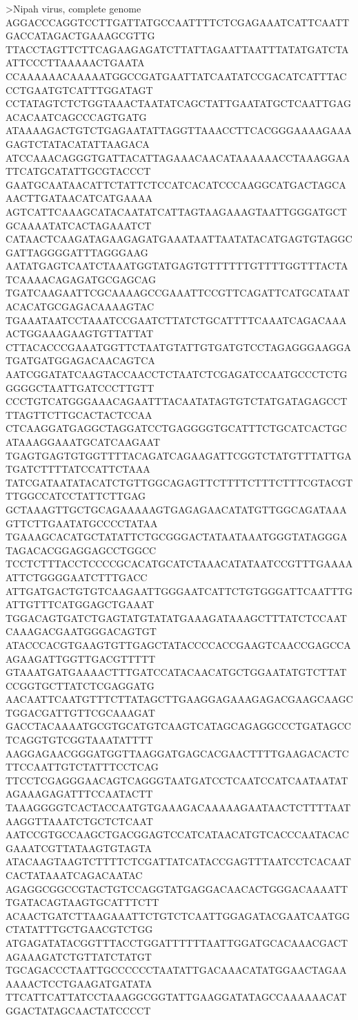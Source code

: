 >Nipah virus, complete genome
AGGACCCAGGTCCTTGATTATGCCAATTTTCTCGAGAAATCATTCAATTGACCATAGACTGAAAGCGTTG
TTACCTAGTTCTTCAGAAGAGATCTTATTAGAATTAATTTATATGATCTAATTCCCTTAAAAACTGAATA
CCAAAAAACAAAAATGGCCGATGAATTATCAATATCCGACATCATTTACCCTGAATGTCATTTGGATAGT
CCTATAGTCTCTGGTAAACTAATATCAGCTATTGAATATGCTCAATTGAGACACAATCAGCCCAGTGATG
ATAAAAGACTGTCTGAGAATATTAGGTTAAACCTTCACGGGAAAAGAAAGAGTCTATACATATTAAGACA
ATCCAAACAGGGTGATTACATTAGAAACAACATAAAAAACCTAAAGGAATTCATGCATATTGCGTACCCT
GAATGCAATAACATTCTATTCTCCATCACATCCCAAGGCATGACTAGCAAACTTGATAACATCATGAAAA
AGTCATTCAAAGCATACAATATCATTAGTAAGAAAGTAATTGGGATGCTGCAAAATATCACTAGAAATCT
CATAACTCAAGATAGAAGAGATGAAATAATTAATATACATGAGTGTAGGCGATTAGGGGATTTAGGGAAG
AATATGAGTCAATCTAAATGGTATGAGTGTTTTTTGTTTTGGTTTACTATCAAAACAGAGATGCGAGCAG
TGATCAAGAATTCGCAAAAGCCGAAATTCCGTTCAGATTCATGCATAATACACATGCGAGACAAAAGTAC
TGAAATAATCCTAAATCCGAATCTTATCTGCATTTTCAAATCAGACAAAACTGGAAAGAAGTGTTATTAT
CTTACACCCGAAATGGTTCTAATGTATTGTGATGTCCTAGAGGGAAGGATGATGATGGAGACAACAGTCA
AATCGGATATCAAGTACCAACCTCTAATCTCGAGATCCAATGCCCTCTGGGGGCTAATTGATCCCTTGTT
CCCTGTCATGGGAAACAGAATTTACAATATAGTGTCTATGATAGAGCCTTTAGTTCTTGCACTACTCCAA
CTCAAGGATGAGGCTAGGATCCTGAGGGGTGCATTTCTGCATCACTGCATAAAGGAAATGCATCAAGAAT
TGAGTGAGTGTGGTTTTACAGATCAGAAGATTCGGTCTATGTTTATTGATGATCTTTTATCCATTCTAAA
TATCGATAATATACATCTGTTGGCAGAGTTCTTTTCTTTCTTTCGTACGTTTGGCCATCCTATTCTTGAG
GCTAAAGTTGCTGCAGAAAAAGTGAGAGAACATATGTTGGCAGATAAAGTTCTTGAATATGCCCCTATAA
TGAAAGCACATGCTATATTCTGCGGGACTATAATAAATGGGTATAGGGATAGACACGGAGGAGCCTGGCC
TCCTCTTTACCTCCCCGCACATGCATCTAAACATATAATCCGTTTGAAAAATTCTGGGGAATCTTTGACC
ATTGATGACTGTGTCAAGAATTGGGAATCATTCTGTGGGATTCAATTTGATTGTTTCATGGAGCTGAAAT
TGGACAGTGATCTGAGTATGTATATGAAAGATAAAGCTTTATCTCCAATCAAAGACGAATGGGACAGTGT
ATACCCACGTGAAGTGTTGAGCTATACCCCACCGAAGTCAACCGAGCCAAGAAGATTGGTTGACGTTTTT
GTAAATGATGAAAACTTTGATCCATACAACATGCTGGAATATGTCTTATCCGGTGCTTATCTCGAGGATG
AACAATTCAATGTTTCTTATAGCTTGAAGGAGAAAGAGACGAAGCAAGCTGGACGATTGTTCGCAAAGAT
GACCTACAAAATGCGTGCATGTCAAGTCATAGCAGAGGCCCTGATAGCCTCAGGTGTCGGTAAATATTTT
AAGGAGAACGGGATGGTTAAGGATGAGCACGAACTTTTGAAGACACTCTTCCAATTGTCTATTTCCTCAG
TTCCTCGAGGGAACAGTCAGGGTAATGATCCTCAATCCATCAATAATATAGAAAGAGATTTCCAATACTT
TAAAGGGGTCACTACCAATGTGAAAGACAAAAAGAATAACTCTTTTAATAAGGTTAAATCTGCTCTCAAT
AATCCGTGCCAAGCTGACGGAGTCCATCATAACATGTCACCCAATACACGAAATCGTTATAAGTGTAGTA
ATACAAGTAAGTCTTTTCTCGATTATCATACCGAGTTTAATCCTCACAATCACTATAAATCAGACAATAC
AGAGGCGGCCGTACTGTCCAGGTATGAGGACAACACTGGGACAAAATTTGATACAGTAAGTGCATTTCTT
ACAACTGATCTTAAGAAATTCTGTCTCAATTGGAGATACGAATCAATGGCTATATTTGCTGAACGTCTGG
ATGAGATATACGGTTTACCTGGATTTTTTAATTGGATGCACAAACGACTAGAAAGATCTGTTATCTATGT
TGCAGACCCTAATTGCCCCCCTAATATTGACAAACATATGGAACTAGAAAAAACTCCTGAAGATGATATA
TTCATTCATTATCCTAAAGGCGGTATTGAAGGATATAGCCAAAAAACATGGACTATAGCAACTATCCCCT
